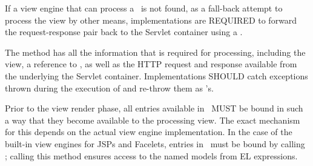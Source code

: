 If a view engine that can process a \Viewable\ is not found, as a fall-back attempt to 
process the view by other means, implementations are 
REQUIRED to forward the request-response pair back to the Servlet container using a 
.

The  method has all the information that is required for processing,
including the view, a reference to \Models, as well as the HTTP request and response
available from the underlying the Servlet container. Implementations SHOULD catch
exceptions thrown during the execution of  and re-throw them as 
's. 

Prior to the view render phase, all entries available in \Models\ MUST be bound in
such a way that they become available to the processing view. The exact mechanism
for this depends on the actual view engine implementation. In the case of the built-in
view engines for JSPs and Facelets, entries in \Models\ must be bound by calling
; calling this method ensures
access to the named models from EL expressions.


